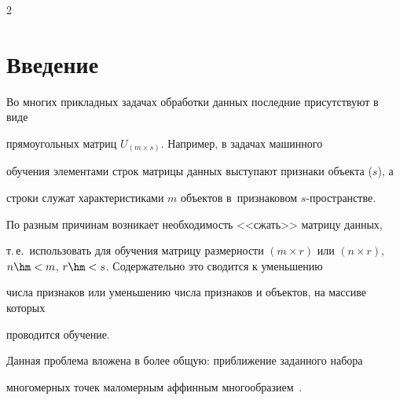 

  















\thispagestyle{headings}





\begin{multicols}{2}





\label{st\stat}





\section{Введение}





Во многих прикладных задачах обработки данных последние присутствуют в виде 


прямоугольных матриц $U_{(m \times s)}$. Например, в задачах машинного


обучения элементами строк матрицы данных выступают признаки объекта ($s$), а 


строки служат характеристиками $m$ объектов в~признаковом \mbox{$s$-про}\-стран\-ст\-ве. 


По разным причинам возникает \mbox{необходимость} <<сжать>> матрицу данных, 


т.\,е.\ использовать для обучения матрицу размерности $(m \times r)$ или $(n 


\times r)$, $n\hm < m$, $r \hm< s$. Содержательно это сводится к уменьшению 


числа признаков или уменьшению числа признаков и объектов, на массиве которых 


проводится обучение.





Данная проблема вложена в более общую: приближение заданного набора 


многомерных точек маломерным аффинным многообразием~\cite{Bruckstein_2009}. 



\end{multicols}
